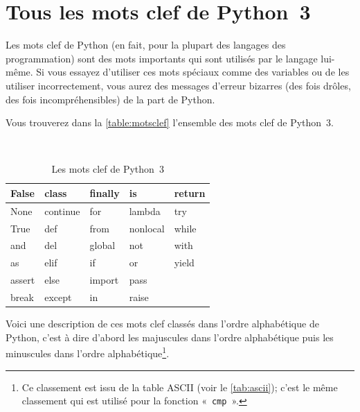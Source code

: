 




\chapter{Tous les mots clef de Python~3}\label{app:motsclef}

Les mots clef de Python (en fait, pour la plupart des langages des programmation) sont des mots importants qui sont utilisés par le langage lui-même. Si vous essayez d'utiliser ces mots spéciaux comme des variables ou de les utiliser incorrectement, vous aurez des messages d'erreur bizarres (des fois drôles, des fois incompréhensibles) de la part de Python. 

Vous trouverez dans la \autoref{table:motsclef} l'ensemble des mots clef de Python~3.

\begin{table}[h!]
\tt
\centering
\begin{tabular}{|l|l|l|l|l|}
\hline False &   class  &    finally &   is    &     return  \\ 
\hline  None   &    continue &  for &       lambda &    try  \\ 
\hline  True  &     def  &      from  &     nonlocal  & while  \\ 
\hline  and    &    del   &     global &    not   &     with \\ 
\hline  as    &     elif  &     if   &      or   &      yield  \\ 
\hline  assert  &   else   &    import   &  pass  & \\ 
\hline  break &      except   &  in    &     raise  &\\ 
\hline 
\end{tabular} 
\rm
\caption{Les mots clef de Python~3}\label{table:motsclef}
\end{table}

Voici une description de ces mots clef classés dans l'ordre alphabétique  de Python, c'est à dire d'abord les majuscules dans l'ordre alphabétique puis les minuscules dans l'ordre alphabétique\footnote{Ce classement est issu de la table ASCII (voir le \autoref{tab:ascii}); c'est le même classement qui est utilisé pour la fonction «~\texttt{cmp}~».}. 

